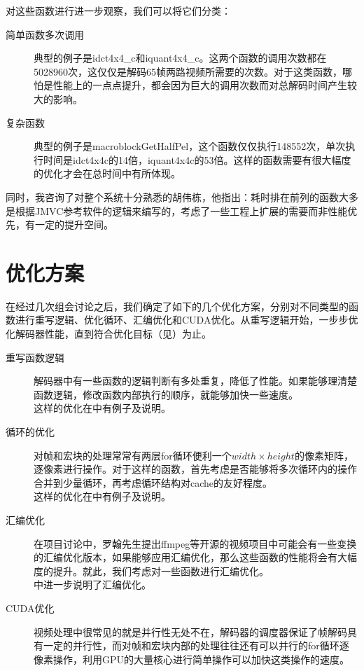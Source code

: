 对这些函数进行进一步观察，我们可以将它们分类：
\begin{description}
\item[简单函数多次调用] 典型的例子是idct4x4\_c和iquant4x4\_c。这两个函数的调用次数都在5028960次，这仅仅是解码65帧两路视频所需要的次数。对于这类函数，哪怕是性能上的一点点提升，都会因为巨大的调用次数而对总解码时间产生较大的影响。
\item[复杂函数] 典型的例子是macroblockGetHalfPel，这个函数仅仅执行148552次，单次执行时间是idct4x4c的14倍，iquant4x4c的53倍。这样的函数需要有很大幅度的优化才会在总时间中有所体现。
\end{description}

同时，我咨询了对整个系统十分熟悉的胡伟栋，他指出：耗时排在前列的函数大多是根据JMVC参考软件的逻辑来编写的，考虑了一些工程上扩展的需要而非性能优先，有一定的提升空间。

\section{优化方案}
\label{sec:optapproach}

在经过几次组会讨论之后，我们确定了如下的几个优化方案，分别对不同类型的函数进行重写逻辑、优化循环、汇编优化和CUDA优化。从重写逻辑开始，一步步优化解码器性能，直到符合优化目标（见）为止。

\begin{description}
\item[重写函数逻辑] 解码器中有一些函数的逻辑判断有多处重复，降低了性能。如果能够理清楚函数逻辑，修改函数内部执行的顺序，就能够加快一些速度。\\这样的优化在中有例子及说明。
\item[循环的优化] 对帧和宏块的处理常常有两层for循环便利一个$width\times height$的像素矩阵，逐像素进行操作。对于这样的函数，首先考虑是否能够将多次循环内的操作合并到少量循环，再考虑循环结构对cache的友好程度。\\这样的优化在中有例子及说明。
\item[汇编优化] 在项目讨论中，罗翰先生提出ffmpeg等开源的视频项目中可能会有一些变换的汇编优化版本，如果能够应用汇编优化，那么这些函数的性能将会有大幅度的提升。就此，我们考虑对一些函数进行汇编优化。\\ 中进一步说明了汇编优化。
\item[CUDA优化] 视频处理中很常见的就是并行性无处不在，解码器的调度器保证了帧解码具有一定的并行性，而对帧和宏块内部的处理往往还有可以并行的for循环逐像素操作，利用GPU的大量核心进行简单操作可以加快这类操作的速度。
\end{description}

